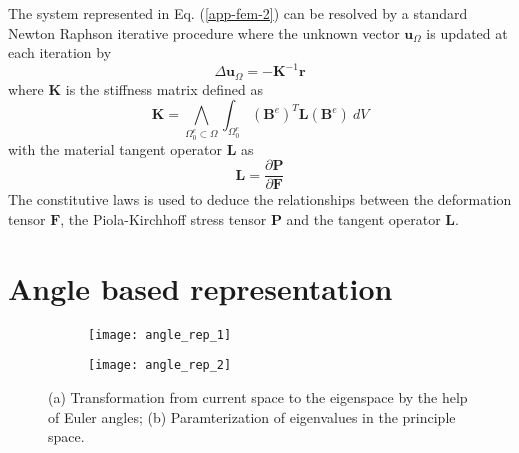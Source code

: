 The system represented in Eq. (\ref{app-fem-2}) can be resolved by a standard Newton Raphson iterative procedure where the unknown vector $ \textbf{u}_\Omega $ is updated at each iteration by
\begin{equation}\label{app-fem-5}
\Delta\textbf{u}_\Omega=-\textbf{K}^{-1}\textbf{r}
\end{equation}
where $ \textbf{K} $ is the stiffness matrix defined as
\begin{equation}\label{app-fem-6}
\textbf{K}=\bigwedge_{\Omega_0^e\subset\Omega}\int_{\Omega_0^e}(\textbf{B}^e)^T\textbf{L}(\textbf{B}^e)\ dV
\end{equation}
with the material tangent operator $ \textbf{L} $ as
\begin{equation}\label{app-fem-7}
\textbf{L}=\frac{\partial\textbf{P}}{\partial\textbf{F}}
\end{equation}
The constitutive laws is used to deduce the relationships between the deformation tensor $ \textbf{F} $, the Piola-Kirchhoff stress tensor $ \textbf{P} $ and the tangent operator $ \textbf{L} $.

\chapter{Angle based representation}\label{app-angle}

\begin{figure}
	\centering
	\begin{subfigure}{0.45\textwidth}
		\texttt{[image: angle\_rep\_1]}
		\caption{}
	\end{subfigure}
	\begin{subfigure}{0.45\textwidth}
	\texttt{[image: angle\_rep\_2]}
	\caption{}
\end{subfigure}
\caption{(a) Transformation from current space to the eigenspace by the help of Euler angles; (b) Paramterization of eigenvalues in the principle space.}\label{app-angle-fig}
\end{figure}

